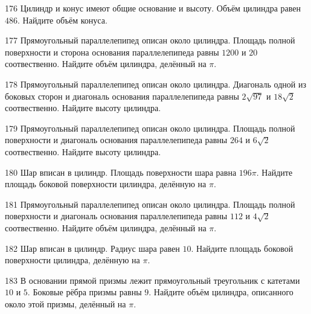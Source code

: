 \documentclass[4apaper]{article}
\begin{document}
\begin{taskBN}{176}
Цилиндр и конус имеют общие основание и высоту. Объём цилиндра равен $486$. Найдите объём конуса.
\end{taskBN}

\begin{taskBN}{177}
Прямоугольный параллелепипед описан около цилиндра. Площадь полной поверхности и сторона основания параллелепипеда равны $1200$ и $20$ соотвественно. Найдите объём цилиндра, делённый на $\pi$.
\end{taskBN}

\begin{taskBN}{178}
Прямоугольный параллелепипед описан около цилиндра. Диагональ одной из боковых сторон и диагональ основания параллелепипеда равны $2\sqrt{97}$ и $18\sqrt{2}$ соотвественно. Найдите высоту цилиндра.
\end{taskBN}

\begin{taskBN}{179}
Прямоугольный параллелепипед описан около цилиндра. Площадь полной поверхности и диагональ основания параллелепипеда равны $264$ и $6\sqrt{2}$ соотвественно. Найдите высоту цилиндра.
\end{taskBN}

\begin{taskBN}{180}
Шар вписан в цилиндр. Площадь поверхности шара равна $196\pi$. Найдите площадь боковой поверхности цилиндра, делённую на $\pi$.
\end{taskBN}

\begin{taskBN}{181}
Прямоугольный параллелепипед описан около цилиндра. Площадь полной поверхности и диагональ основания параллелепипеда равны $112$ и $4\sqrt{2}$ соотвественно. Найдите объём цилиндра, делённый на $\pi$.
\end{taskBN}

\begin{taskBN}{182}
Шар вписан в цилиндр. Радиус шара равен $10$. Найдите площадь боковой поверхности цилиндра, делённую на $\pi$.
\end{taskBN}

\begin{taskBN}{183}
В основании прямой призмы лежит прямоугольный треугольник с катетами $10$ и $5$. Боковые рёбра призмы равны $9$. Найдите объём цилиндра, описанного около этой призмы, делённый на $\pi$.
\end{taskBN}
\end{document}
